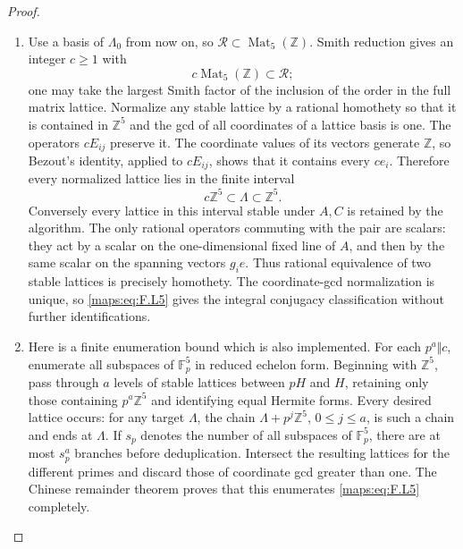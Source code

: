 \documentclass[11pt,a4paper]{article}
\theoremstyle{definition}
\begin{document}
\begin{proof}
\begin{enumerate}[label=\arabic*.]
\item Use a basis of $\Lambda_0$ from now on, so
$\mathcal R\subset\operatorname{Mat}_5(\mathbb Z)$.
Smith reduction gives an integer $c\ge1$ with
\[
 c\operatorname{Mat}_5(\mathbb Z)\subset\mathcal R;
 \tag{F.L4}\label{maps:eq:F.L4}
\]
one may take the largest Smith factor of the inclusion
of the order in the full matrix lattice.
Normalize any stable lattice by a rational homothety so
that it is contained in $\mathbb Z^5$ and the gcd of all
coordinates of a lattice basis is one.
The operators $cE_{ij}$ preserve it.  The coordinate values
of its vectors generate $\mathbb Z$, so Bezout's identity,
applied to $cE_{ij}$, shows that it contains every $ce_i$.
Therefore every normalized lattice lies in the finite interval
\[
 c\mathbb Z^5\subset\Lambda\subset\mathbb Z^5.
 \tag{F.L5}\label{maps:eq:F.L5}
\]
Conversely every lattice in this interval stable under
$A,C$ is retained by the algorithm.
The only rational operators commuting with the pair are
scalars: they act by a scalar on the one-dimensional fixed
line of $A$, and then by the same scalar on the spanning
vectors $g_ie$.  Thus rational equivalence of two stable
lattices is precisely homothety.  The coordinate-gcd
normalization is unique, so \eqref{maps:eq:F.L5} gives the integral
conjugacy classification without further identifications.

\item Here is a finite enumeration bound which is also implemented.
For each $p^a\Vert c$, enumerate all subspaces of
$\mathbb F_p^5$ in reduced echelon form.
Beginning with $\mathbb Z^5$, pass through $a$ levels of
stable lattices between $pH$ and $H$, retaining only those
containing $p^a\mathbb Z^5$ and identifying equal Hermite
forms.  Every desired lattice occurs: for any target
$\Lambda$, the chain
$\Lambda+p^j\mathbb Z^5$, $0\le j\le a$, is such a
chain and ends at $\Lambda$.
If $s_p$ denotes the number of all subspaces of
$\mathbb F_p^5$, there are at most $s_p^a$ branches before
deduplication.  Intersect the resulting lattices for the
different primes and discard those of coordinate gcd
greater than one.  The Chinese remainder theorem proves
that this enumerates \eqref{maps:eq:F.L5} completely.


\end{enumerate}
\end{proof}
\end{document}

